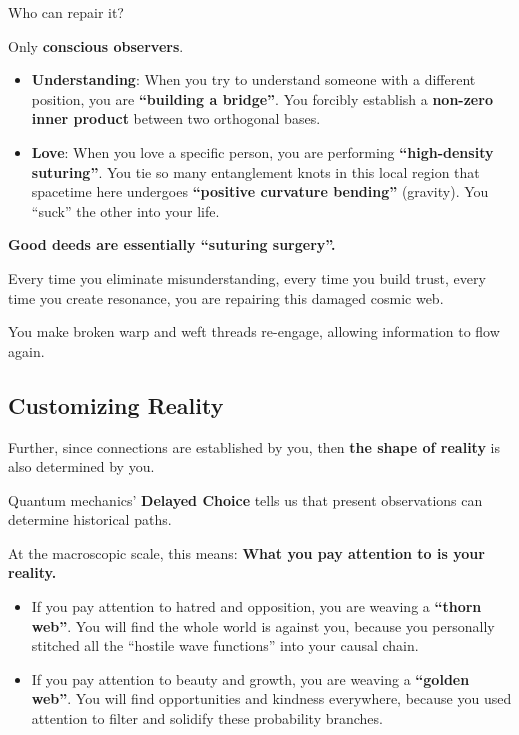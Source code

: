 Who can repair it?

Only \textbf{conscious observers}.

\begin{itemize}
\item \textbf{Understanding}: When you try to understand someone with a different position, you are \textbf{``building a bridge''}. You forcibly establish a \textbf{non-zero inner product} between two orthogonal bases.

\item \textbf{Love}: When you love a specific person, you are performing \textbf{``high-density suturing''}. You tie so many entanglement knots in this local region that spacetime here undergoes \textbf{``positive curvature bending''} (gravity). You ``suck'' the other into your life.
\end{itemize}

\textbf{Good deeds are essentially ``suturing surgery''.}

Every time you eliminate misunderstanding, every time you build trust, every time you create resonance, you are repairing this damaged cosmic web.

You make broken warp and weft threads re-engage, allowing information to flow again.

\subsection{Customizing Reality}

Further, since connections are established by you, then \textbf{the shape of reality} is also determined by you.

Quantum mechanics' \textbf{Delayed Choice} tells us that present observations can determine historical paths.

At the macroscopic scale, this means: \textbf{What you pay attention to is your reality.}

\begin{itemize}
\item If you pay attention to hatred and opposition, you are weaving a \textbf{``thorn web''}. You will find the whole world is against you, because you personally stitched all the ``hostile wave functions'' into your causal chain.

\item If you pay attention to beauty and growth, you are weaving a \textbf{``golden web''}. You will find opportunities and kindness everywhere, because you used attention to filter and solidify these probability branches.
\end{itemize}

